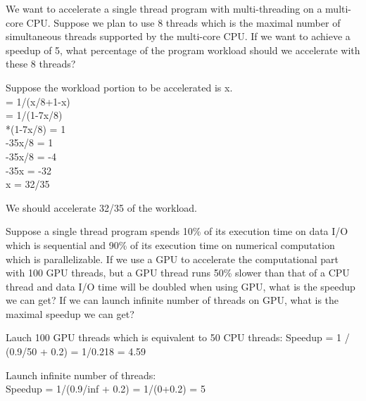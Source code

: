 \documentclass[a4paper, 12pt, addpoints]{exam}
\begin{document}
\begin{questions}

\raggedright

\question[10]
We want to accelerate a single thread program with multi-threading on a multi-core CPU. Suppose we plan to use 8 threads which is the maximal number of simultaneous threads supported by the multi-core CPU. If we want to achieve a speedup of 5, what percentage of the program workload should we accelerate with these 8 threads?

\begin{solution} 
\newpage

Suppose the workload portion to be accelerated is x.  \\
 = 1/(x/8+1-x)   \\
 = 1/(1-7x/8)   \\
*(1-7x/8) = 1   \\
-35x/8 = 1   \\
\centering -35x/8 = -4   \\
\centering -35x = -32   \\
\centering x = 32/35   \\
\raggedright We should accelerate 32/35 of the workload.
\end{solution} 
\newpage


\raggedright

\question[10]
Suppose a single thread program spends 10\% of its execution time on data I/O which is sequential and 90\% of its execution time on numerical computation which is parallelizable. If we use a GPU to accelerate the computational part with 100 GPU threads, but a GPU thread runs 50\% slower than that of a CPU thread and data I/O time will be doubled when using GPU, what is the speedup we can get? If we can launch infinite number of threads on GPU, what is the maximal speedup we can get?

\begin{solution} 
\newpage

Lauch 100 GPU threads which is equivalent to 50 CPU threads:
\centering Speedup = 1 / (0.9/50 + 0.2) = 1/0.218 = 4.59   \\
\raggedright Launch infinite number of threads: \\
\centering Speedup = 1/(0.9/inf + 0.2) = 1/(0+0.2) = 5   \\
\end{solution} 
\newpage



\end{questions}
\end{document}

